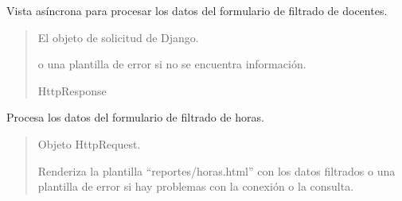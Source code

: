\documentclass[letterpaper,10pt,spanish]{sphinxmanual}
\begin{document}
\begin{fulllineitems}

\pysigstartsignatures
{}
\pysigstopsignatures
\sphinxAtStartPar
Vista asíncrona para procesar los datos del formulario de filtrado de docentes.
\begin{quote}\begin{description}
\sphinxAtStartPar
{} \textendash{} El objeto de solicitud de Django.

\sphinxAtStartPar
\begin{description}
\sphinxAtStartPar
o una plantilla de error si no se encuentra información.

\end{description}


\sphinxAtStartPar
HttpResponse

\end{description}\end{quote}

\end{fulllineitems}



\begin{fulllineitems}

\pysigstartsignatures
{}
\pysigstopsignatures
\sphinxAtStartPar
Procesa los datos del formulario de filtrado de horas.
\begin{quote}\begin{description}
\sphinxAtStartPar
{} \textendash{} Objeto HttpRequest.

\sphinxAtStartPar
Renderiza la plantilla “reportes/horas.html” con los datos filtrados
o una plantilla de error si hay problemas con la conexión o la consulta.

\end{description}\end{quote}

\end{fulllineitems}
\end{document}

